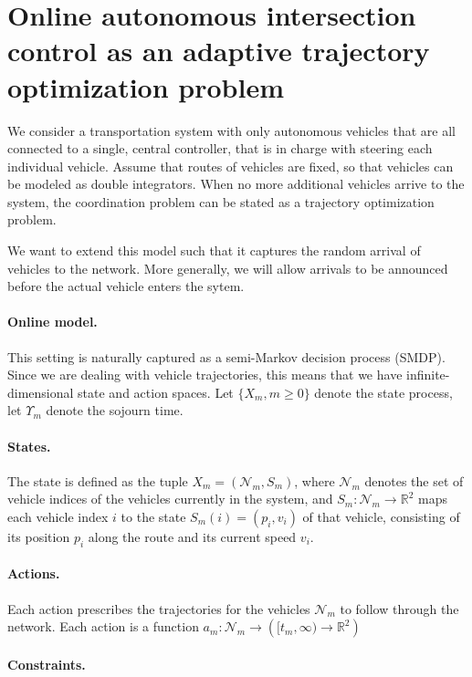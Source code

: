 \documentclass{article}
\newcommand\halfopen[2]{\ensuremath{[#1,#2)}}
\begin{document}
\section{Online autonomous intersection control as
  an adaptive trajectory optimization problem}

We consider a transportation system with only autonomous vehicles that are all
connected to a single, central controller, that is in charge with steering each
individual vehicle.
%
Assume that routes of vehicles are fixed, so that vehicles can be modeled as
double integrators.
%
When no more additional vehicles arrive to the system, the coordination problem
can be stated as a trajectory optimization problem.

We want to extend this model such that it captures the random arrival of
vehicles to the network. More generally, we will allow arrivals to be announced
before the actual vehicle enters the sytem.

\paragraph{Online model.}
This setting is naturally captured as a semi-Markov decision process (SMDP).
Since we are dealing with vehicle trajectories, this means that we have
infinite-dimensional state and action spaces.
%
Let $\{ X_m, m \geq 0 \}$ denote the state process, let $\Upsilon_m$ denote the
sojourn time.

\paragraph{States.}
The state is defined as the tuple $X_m = (\mathcal{N}_m, S_m)$, where
$\mathcal{N}_m$ denotes the set of vehicle indices of the vehicles currently in
the system, and $S_m : \mathcal{N}_m \rightarrow \mathbb{R}^2$ maps each vehicle
index $i$ to the state $S_m(i) = (p_i, v_i)$ of that vehicle, consisting of its
position $p_i$ along the route and its current speed $v_i$.

\paragraph{Actions.}
Each action prescribes the trajectories for the vehicles $\mathcal{N}_m$ to
follow through the network.
%
Each action is a function
$a_m : \mathcal{N}_m \rightarrow (\halfopen{t_m}{\infty} \rightarrow \mathbb{R}^2)$

\paragraph{Constraints.}
\end{document}
